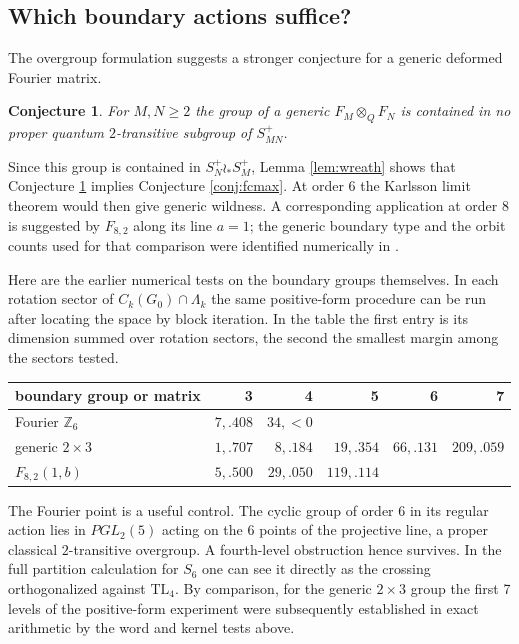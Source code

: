 \documentclass[11pt,a4paper]{amsart}
\newtheorem{conjecture}[theorem]{Conjecture}
\newcommand{\TL}{\mathrm{TL}}
\begin{document}
\subsection{Which boundary actions suffice?}
The overgroup formulation suggests a stronger conjecture for a generic deformed Fourier matrix.
\begin{conjecture}\label{conj:jordan}
For $M,N\geq2$ the group of a generic $F_M\otimes_Q F_N$ is contained in no proper quantum $2$-transitive subgroup of $S_{MN}^+$.
\end{conjecture}
Since this group is contained in $S_N^+\wr_*S_M^+$, Lemma \ref{lem:wreath} shows that Conjecture \ref{conj:jordan} implies Conjecture \ref{conj:fcmax}. At order 6 the Karlsson limit theorem would then give generic wildness. A corresponding application at order 8 is suggested by $F_{8,2}$ along its line $a=1$; the generic boundary type and the orbit counts used for that comparison were identified numerically in \cite[Section 8]{bo}.

Here are the earlier numerical tests on the boundary groups themselves. In each rotation sector of $C_k(G_0)\cap\Lambda_k$ the same positive-form procedure can be run after locating the space by block iteration. In the table the first entry is its dimension summed over rotation sectors, the second the smallest margin among the sectors tested.
\begin{center}\small
\begin{tabular}{lrrrrr}
\toprule
boundary group or matrix & 3 & 4 & 5 & 6 & 7\\ \midrule
Fourier $\mathbb Z_6$ & $7,.408$ & $34,{<}0$ & & &\\
generic $2\times3$ & $1,.707$ & $8,.184$ & $19,.354$ & $66,.131$ & $209,.059$\\
$F_{8,2}(1,b)$ & $5,.500$ & $29,.050$ & $119,.114$ & &\\ \bottomrule
\end{tabular}
\end{center}
The Fourier point is a useful control. The cyclic group of order 6 in its regular action lies in $PGL_2(5)$ acting on the 6 points of the projective line, a proper classical $2$-transitive overgroup. A fourth-level obstruction hence survives. In the full partition calculation for $S_6$ one can see it directly as the crossing orthogonalized against $\TL_4$. By comparison, for the generic $2\times3$ group the first 7 levels of the positive-form experiment were subsequently established in exact arithmetic by the word and kernel tests above.
\end{document}
